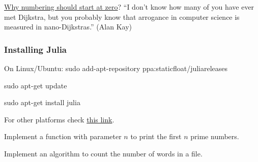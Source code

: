 \documentclass{beamer}
\begin{document}
\begin{frame}
  \href{https://www.cs.utexas.edu/users/EWD/transcriptions/EWD08xx/EWD831.html}{Why numbering should start at zero}?
  \pause
  ``I don't know how many of you have ever met Dijkstra, but you probably know that arrogance in computer science is measured in nano-Dijkstras.'' (Alan Kay)
\end{frame}

\begin{frame}
  \frametitle{Installing Julia}

  \begin{block}{On Linux/Ubuntu:}
  sudo add-apt-repository ppa:staticfloat/juliareleases

  sudo apt-get update

  sudo apt-get install julia  
  \end{block}
  \vspace{2cm}
  For other platforms check \href{http://julialang.org/downloads/platform.html}{this link}.
\end{frame}

\begin{frame}
  Implement a function with parameter $n$ to print the first $n$ prime numbers. 
\end{frame}

\begin{frame}
  Implement an algorithm to count the number of words in a file.
\end{frame}
\end{document}
